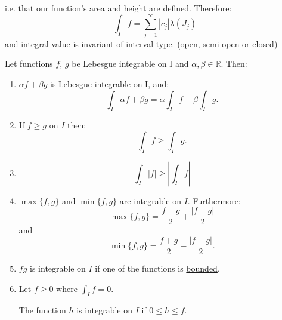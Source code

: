 \documentclass{article}
\begin{document}
i.e. that our function's area and height are defined. Therefore:
$$\int_I f = \sum_{j=1}^{\infty} |c_j| \lambda(J_j)$$
and integral value is \underline{invariant of interval type}. (open, semi-open or closed)

Let functions $f$, $g$ be Lebesgue integrable on I and $\alpha, \beta\in\mathbb{R}$. Then:
\begin{enumerate}
    \item $\alpha f+\beta g$ is Lebesgue integrable on I, and:
    $$\int_I\alpha f+\beta g=\alpha\int_I f + \beta\int_I g.$$

    \item If $f\geq g$ on $I$ then:
    $$\int_I f\geq\int_I g.$$

    \item $$\int_I|f|\geq|\int_I f|$$

    \item $\max\{f,g\}$ and $\min\{f,g\}$ are integrable on $I$. Furthermore:
    $$\max\{f,g\}=\frac{f+g}{2}+\frac{|f-g|}{2}$$
    and
    $$\min\{f,g\}=\frac{f+g}{2}-\frac{|f-g|}{2}.$$

    \item $fg$ is integrable on $I$ if one of the functions is \underline{bounded}.

    \item Let $f\geq0$ where $\displaystyle\int_I f=0$.
    
    The function $h$ is integrable on $I$ if $0\leq h\leq f$.
\end{enumerate}

\newpage
\end{document}
